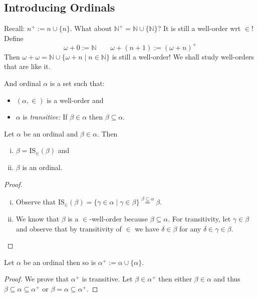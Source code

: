 \documentclass{whrartcl}
\newcommand{\NN}{\mathbb{N}}
\newcommand{\IS}{\text{IS}}
\begin{document}
\subsection{Introducing Ordinals}

\begin{remark}
  Recall: $n^+ := n \cup \{n\}$. What about $\NN^+ = \NN \cup \{\NN\}$?
  It is still a well-order wrt $\in$! Define
  \[
    \omega + 0 := \NN \qquad \omega + (n + 1) := (\omega + n)^+
  \]
  Then $\omega + \omega = \NN \cup \{\omega + n \mid n \in \NN\}$ is still a
  well-order! We shall study well-orders that are like it.
\end{remark}

\begin{definition}
  And ordinal $\alpha$ is a set such that:
  \begin{itemize}
  \item $(\alpha, \in)$ is a well-order and
  \item $\alpha$ is \emph{transitive:} If $\beta \in \alpha$ then $\beta
    \subseteq \alpha$.
  \end{itemize}
\end{definition}

\begin{lemma}
  Let $\alpha$ be an ordinal and $\beta \in \alpha$. Then
  \begin{enumerate}[(i)]
  \item $\beta = \IS_\in(\beta)$ and
  \item $\beta$ is an ordinal.
  \end{enumerate}
\end{lemma}
\begin{proof}
  \
  \begin{enumerate}[(i)]
  \item Observe that $\IS_\in(\beta) = \{\gamma \in \alpha \mid \gamma \in
    \beta\} \stackrel{\beta \subseteq \alpha}{=} \beta$.
  \item We know that $\beta$ is a $\in$-well-order because $\beta \subseteq \alpha$.
    For transitivity, let $\gamma \in \beta$ and observe that by transitivity of
    $\in$ we have $\delta \in \beta$ for any $\delta \in \gamma \in \beta$.
  \end{enumerate}
\end{proof}

\begin{lemma}
  Let $\alpha$ be an ordinal then so is $\alpha^+ := \alpha \cup \{\alpha\}$.
\end{lemma}
\begin{proof}
  We prove that $\alpha^+$ is transitive. Let $\beta \in \alpha^+$ then either
  $\beta \in \alpha$ and thus $\beta \subseteq \alpha \subseteq \alpha^+$ or
  $\beta = \alpha \subseteq \alpha^+$.
\end{proof}
\end{document}
